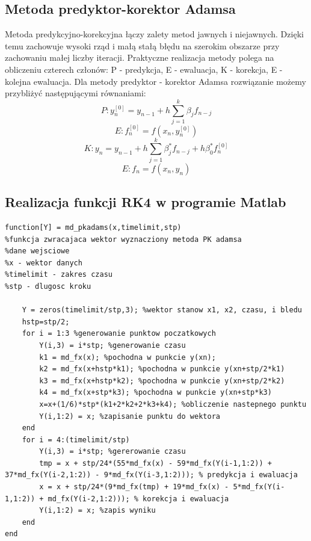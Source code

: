 \documentclass[a4paper, 12pt]{article}
\begin{document}
\subsection{Metoda predyktor-korektor Adamsa}
Metoda predykcyjno-korekcyjna łączy zalety metod jawnych i niejawnych. Dzięki temu zachowuje wysoki rząd i małą stałą błędu na szerokim obszarze przy zachowaniu małej liczby iteracji. Praktyczne realizacja metody polega na obliczeniu czterech członów: P - predykcja, E - ewaluacja, K - korekcja, E - kolejna ewaluacja. Dla metody predyktor - korektor Adamsa rozwiązanie możemy przybliżyć następującymi równaniami: 
$$P:  y_{n}^{[0]} = y_{n-1} + h \sum_{j=1}^{k} \beta_{j}f_{n-j}$$
$$E:  f_{n}^{[0]} = f(x_{n},y_{n}^{[0]})$$
$$K:  y_{n} = y_{n-1} + h \sum_{j=1}^{k} \beta_{j}^{*}f_{n-j}+h\beta_{0}^{*}f_{n}^{[0]}$$
$$E:  f_{n} = f(x_{n},y_{n})$$


\subsection{Realizacja funkcji RK4 w programie Matlab}
\begin{lstlisting}
function[Y] = md_pkadams(x,timelimit,stp)
%funkcja zwracajaca wektor wyznacziony metoda PK adamsa 
%dane wejsciowe
%x - wektor danych 
%timelimit - zakres czasu
%stp - dlugosc kroku
   
    Y = zeros(timelimit/stp,3); %wektor stanow x1, x2, czasu, i bledu
    hstp=stp/2;
    for i = 1:3 %generowanie punktow poczatkowych
        Y(i,3) = i*stp; %generowanie czasu
        k1 = md_fx(x); %pochodna w punkcie y(xn);
        k2 = md_fx(x+hstp*k1); %pochodna w punkcie y(xn+stp/2*k1) 
        k3 = md_fx(x+hstp*k2); %pochodna w punkcie y(xn+stp/2*k2)
        k4 = md_fx(x+stp*k3); %pochodna w punkcie y(xn+stp*k3)
        x=x+(1/6)*stp*(k1+2*k2+2*k3+k4); %obliczenie nastepnego punktu
        Y(i,1:2) = x; %zapisanie punktu do wektora
    end
    for i = 4:(timelimit/stp)
        Y(i,3) = i*stp; %gererowanie czasu
        tmp = x + stp/24*(55*md_fx(x) - 59*md_fx(Y(i-1,1:2)) + 37*md_fx(Y(i-2,1:2)) - 9*md_fx(Y(i-3,1:2))); % predykcja i ewaluacja
        x = x + stp/24*(9*md_fx(tmp) + 19*md_fx(x) - 5*md_fx(Y(i-1,1:2)) + md_fx(Y(i-2,1:2))); % korekcja i ewaluacja
        Y(i,1:2) = x; %zapis wyniku
    end
end

\end{lstlisting}
\end{document}
